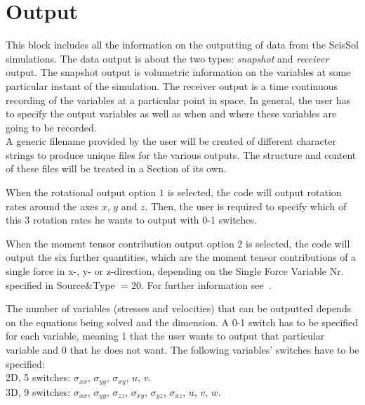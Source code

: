 \documentclass[12pt,twoside]{article}
\begin{document}
\newpage

\section{Output}
\label{sec-block-out}

This block includes all the information on the outputting of data from the SeisSol simulations.
The data output is about the two types: \textit{snapshot} and \textit{receiver} output.
The snapshot output is volumetric information on the variables at some particular instant of the simulation.
The receiver output is a time continuous recording of the variables at a particular point in space.
In general, the user has to specify the output variables as well as when and where these variables are going to be recorded.\\

\noindent
A generic filename provided by the user will be created of different character strings to produce unique files for the various outputs.
The structure and content of these files will be treated in a Section of its own.

\noindent
When the rotational output option $1$ is selected, the code will output rotation rates around the axes $x$, $y$ and $z$.
Then, the user is required to specify which of this 3 rotation rates he wants to output with 0-1 switches.

\noindent
When the moment tensor contribution output option $2$ is selected, the code will output the six further quantities, which are
the moment tensor contributions of a single force in x-, y- or z-direction, depending on the Single Force Variable Nr. specified
in Source\&Type $= 20$. For further information see~\cite{GravesWald01}.

\noindent
The number of variables (stresses and velocities) that can be outputted depends on the equations being solved and the dimension.
A 0-1 switch has to be specified for each variable, meaning 1 that the user wants to output that particular variable 
and 0 that he does not want. The following variables' switches have to be specified:\\
2D, 5 switches: $\sigma_{xx}$, $\sigma_{yy}$, $\sigma_{xy}$, $u$, $v$.\\
3D, 9 switches: $\sigma_{xx}$, $\sigma_{yy}$, $\sigma_{zz}$, $\sigma_{xy}$, $\sigma_{yz}$, $\sigma_{xz}$, $u$, $v$, $w$.\\
\end{document}
